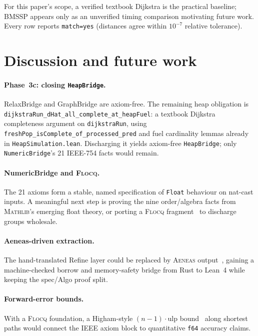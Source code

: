 \documentclass[11pt,a4paper]{article}
\newcommand{\Lean}{Lean~4\xspace}
\newcommand{\Mathlib}{\textsc{Mathlib}\xspace}
\newcommand{\BMSSP}{\textsc{BMSSP}\xspace}
\newcommand{\Dijkstra}{Dijkstra\xspace}
\newcommand{\code}[1]{\texttt{#1}}
\theoremstyle{plain}
\theoremstyle{definition}
\begin{document}
For this paper's scope, a verified textbook \Dijkstra{} is the practical
baseline; \BMSSP{} appears only as an unverified timing comparison motivating
future work. Every row reports \code{match=yes} (distances agree within
$10^{-7}$ relative tolerance).

\section{Discussion and future work}\label{sec:discussion}

\paragraph*{Phase~3c: closing \code{HeapBridge}.}
RelaxBridge and GraphBridge are axiom-free. The remaining heap obligation is
\code{dijkstraRun\_dHat\_all\_complete\_at\_heapFuel}: a textbook Dijkstra
completeness argument on \code{dijkstraRun}, using
\code{freshPop\_isComplete\_of\_processed\_pred} and fuel cardinality lemmas
already in \code{HeapSimulation.lean}. Discharging it yields axiom-free
\code{HeapBridge}; only \code{NumericBridge}'s 21 IEEE-754 facts would remain.

\paragraph*{NumericBridge and \textsc{Flocq}.}
The 21 axioms form a stable, named specification of \code{Float} behaviour on
nat-cast inputs. A meaningful next step is proving the nine order/algebra facts
from \Mathlib's emerging float theory, or porting a \textsc{Flocq}
fragment~\cite{BoldoMelquiond2011Flocq,BoldoMelquiond2017Book} to discharge
groups wholesale.

\paragraph*{Aeneas-driven extraction.}
The hand-translated Refine layer could be replaced by \textsc{Aeneas}
output~\cite{HoProtzenko2022Aeneas,HoFromherzProtzenko2024Aeneas}, gaining a
machine-checked borrow and memory-safety bridge from Rust to \Lean{} while
keeping the spec/Algo proof split.

\paragraph*{Forward-error bounds.}
With a \textsc{Flocq} foundation, a Higham-style $(n-1)\cdot\mathrm{ulp}$
bound~\cite{Higham2002Accuracy} along shortest paths would connect the
IEEE axiom block to quantitative \code{f64} accuracy claims.
\end{document}
